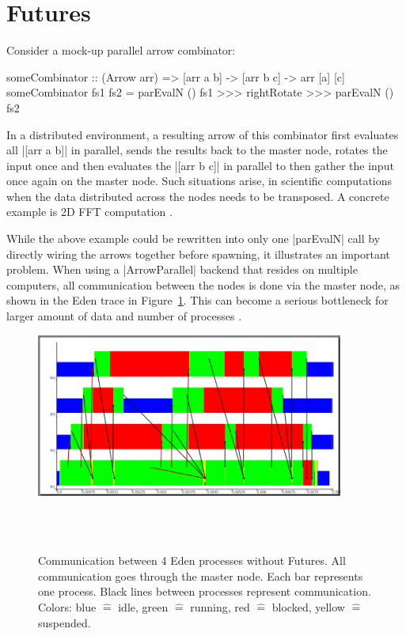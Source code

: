 \section{Futures} \label{sec:futures}
Consider a mock-up parallel arrow combinator:
\begin{code}
someCombinator :: (Arrow arr) => [arr a b] -> [arr b c] -> arr [a] [c]
someCombinator fs1 fs2 = parEvalN () fs1 >>> rightRotate >>> parEvalN () fs2
\end{code}

In a distributed environment, a resulting arrow of this combinator first evaluates all |[arr a b]| in parallel, sends the results back to the master node, rotates the input once and then evaluates the |[arr b c]| in parallel to then gather the input once again on the master node.
Such situations arise, \eg in scientific computations when the data distributed across the nodes needs to be transposed. A concrete example is 2D FFT computation \cite{Gorlatch,Berthold2009-fft}.

While the above example could be rewritten into only one |parEvalN| call by directly wiring the arrows together before spawning, it illustrates an important problem. When using a |ArrowParallel| backend that resides on multiple computers, all communication between the nodes is done via the master node, as shown in the Eden trace in Figure~\ref{fig:withoutFutures}. This can become a serious bottleneck %
for larger amount of data and number of processes \citep[as e.g.][showcases]{Berthold2009-fft}.
\begin{figure}[ht]
	\centering
	\includegraphics[width=0.9\textwidth]{images/withoutFutures}
	\caption[without Futures]{Communication between 4 Eden processes without Futures. All communication goes through the master node. Each bar represents one process. Black lines between processes represent communication. Colors: blue $\hat{=}$ idle, green $\hat{=}$ running, red  $\hat{=}$ blocked, yellow $\hat{=}$ suspended.}
	\label{fig:withoutFutures}
\\
\\
\end{figure}

